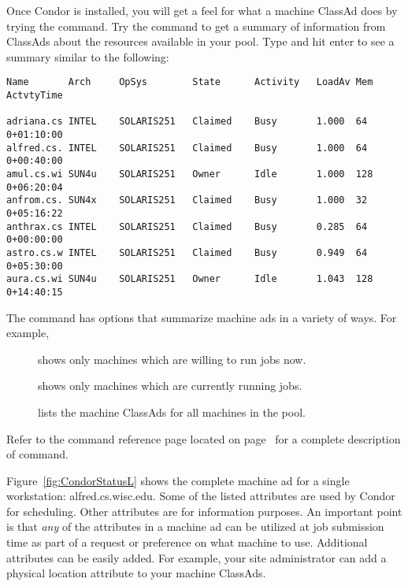 Once Condor is installed,
you will get a feel for what
a machine ClassAd does by trying
the  command.
Try the  command to get
a summary of information from
ClassAds about the resources available in your pool.
Type  and hit enter to see a summary 
similar to the following:
\begin{center}
\begin{verbatim}
Name       Arch     OpSys        State      Activity   LoadAv Mem  ActvtyTime

adriana.cs INTEL    SOLARIS251   Claimed    Busy       1.000  64    0+01:10:00
alfred.cs. INTEL    SOLARIS251   Claimed    Busy       1.000  64    0+00:40:00
amul.cs.wi SUN4u    SOLARIS251   Owner      Idle       1.000  128   0+06:20:04
anfrom.cs. SUN4x    SOLARIS251   Claimed    Busy       1.000  32    0+05:16:22
anthrax.cs INTEL    SOLARIS251   Claimed    Busy       0.285  64    0+00:00:00
astro.cs.w INTEL    SOLARIS251   Claimed    Busy       0.949  64    0+05:30:00
aura.cs.wi SUN4u    SOLARIS251   Owner      Idle       1.043  128   0+14:40:15
\end{verbatim}
\Dots 
\end{center}


The  command has options that summarize machine ads 
in a variety of ways.
For example,
\begin{description}
\item[] shows only machines which are
willing to run jobs now. 
\item[] shows only machines
which are currently running jobs.  
\item[] lists the machine ClassAds for all machines
in the pool.
\end{description}

Refer to the  command 
reference page located on page~\pageref{man-condor-status}
for a complete description of  command.

Figure~\ref{fig:CondorStatusL} shows the complete machine ad
for a single workstation: alfred.cs.wisc.edu. Some of the listed
attributes are used by
Condor for scheduling. Other attributes are for information purposes.
An important point is that \emph{any} of the attributes in a
machine ad can be utilized at job submission time as part of a request
or preference on what machine to use. Additional attributes
can be easily added. For example, your site administrator can
add a physical location attribute to your machine ClassAds.

